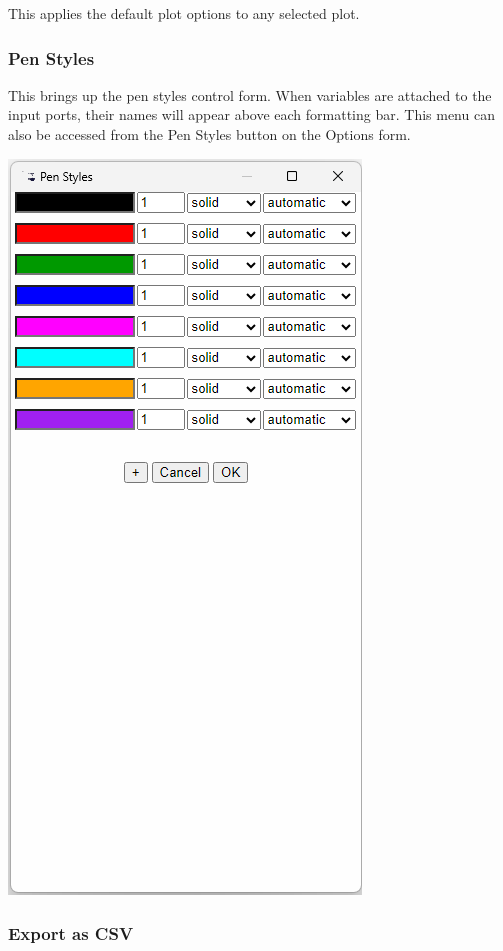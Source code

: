 This applies the default plot options to any selected plot.

\subsubsection{Pen Styles }

This brings up the pen styles control form. When variables are attached
to the input ports, their names will appear above each formatting
bar. This menu can also be accessed from the Pen Styles button on
the Options form.

\includegraphics[height=0.65\textheight]{images/PlotPenStyles}

\subsubsection{Export as CSV}

